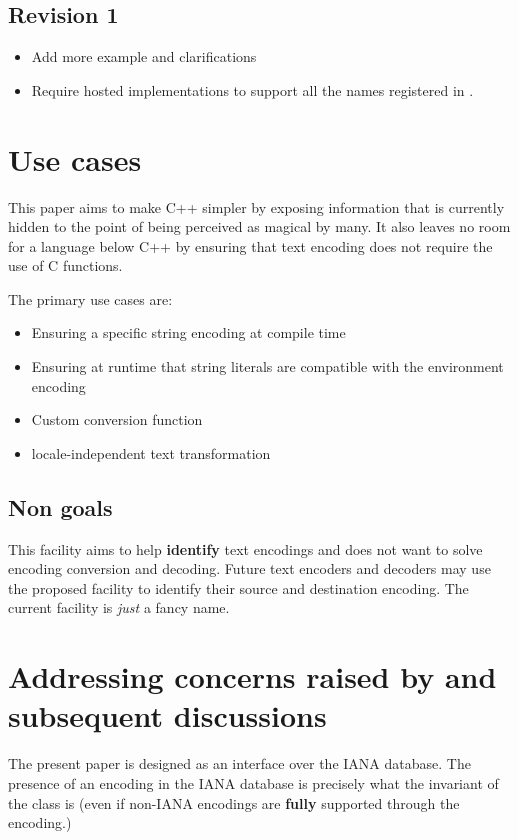 \documentclass{wg21}
\begin{document}
\subsection*{Revision 1}
\begin{itemize}
    \item Add more example and clarifications
    \item Require hosted implementations to support all the names registered in \cite{ianacharset-mib}.
\end{itemize}

\section{Use cases}

This paper aims to make C++ simpler by exposing information that is currently hidden to the point of
being perceived as magical by many.
It also leaves no room for a language below C++ by ensuring that text encoding does not require the use of C functions.

The primary use cases are:

\begin{itemize}
    \item Ensuring a specific string encoding at compile time
    \item Ensuring at runtime that string literals are compatible with the environment encoding
    \item Custom conversion function
    \item locale-independent text transformation
\end{itemize}

\subsection{Non goals}

This facility aims to help \textbf{identify} text encodings and does not want to solve encoding conversion and decoding.
Future text encoders and decoders may use the proposed facility to identify their source and destination encoding.
The current facility is \emph{just} a fancy name.


\label{P2498-concerns} \section{Addressing concerns raised by and subsequent discussions }

The present paper is designed as an interface over the IANA database. The presence of an encoding in the IANA database is precisely what the invariant of the class is (even if non-IANA encodings are \textbf{fully} supported through the  encoding.)
\end{document}
